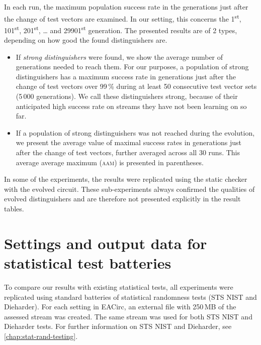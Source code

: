 \documentclass[12pt,oneside]{fithesis2}		%
\renewcommand{\_}{\leavevmode \kern0.0em\vbox{\hrule width0.4em}}
\newcommand{\squarebullet}{\textcolor{black}{\raisebox{0.15em}{\rule{4pt}{4pt}}}}
\newenvironment{myItemize}{
  \begin{itemize}[leftmargin=2em,rightmargin=1em,itemsep=\parskip ,parsep=0em,topsep=0em,partopsep=0em]
  \renewcommand{\labelitemi}{\squarebullet}
  \renewcommand{\labelitemii}{$\diamond$}
}{
  \end{itemize}
}
\begin{document}
In each run, the maximum population success rate in the generations just after the change of test vectors are examined.
In our setting, this concerns the 1\textsuperscript{st}, 101\textsuperscript{st}, 201\textsuperscript{st}, \dots{} 
and 29901\textsuperscript{st} generation.
The presented results are of 2 types, depending on how good the found distinguishers are.
\begin{myItemize}
\item If \textit{strong distinguishers} were found, we show the average number of generations needed
to reach them. For our purposes, a population of strong distinguishers has a maximum success rate in generations just
after the change of test vectors over 99\,\% during at least 50 consecutive test vector sets (5\,000 generations).
We call these distinguishers strong, because of their anticipated high success rate on streams they have not been learning on so far.
\item If a population of strong distinguishers was not reached during the evolution, 
we present the average value of maximal success rates in generations just after the change of test vectors,
further averaged across all 30 runs. This average average maximum (\textsc{aam}) is presented in parentheses.
\end{myItemize}

\noindent
In some of the experiments, the results were replicated using the static checker with the evolved circuit.
These sub-experiments always confirmed the qualities of evolved distinguishers and are therefore not presented explicitly
in the result tables.

\section{Settings and output data for statistical test batteries}
\label{sec:settings-statistics}

To compare our results with existing statistical tests, all experiments were replicated using standard batteries of statistical
randomness tests (STS NIST and Dieharder). 
For each setting in EACirc, an external file with 250\,MB of the assessed stream was created.
The same stream was used for both STS NIST and Dieharder tests. For further information on STS NIST and Dieharder, 
see \autoref{chap:stat-rand-testing}.
\end{document}
